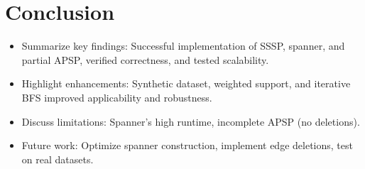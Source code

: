 \documentclass[11pt]{article}
\begin{document}
\section{Conclusion}
\begin{itemize}
    \item Summarize key findings: Successful implementation of SSSP, spanner, and partial APSP, verified correctness, and tested scalability.
    \item Highlight enhancements: Synthetic dataset, weighted support, and iterative BFS improved applicability and robustness.
    \item Discuss limitations: Spanner’s high runtime, incomplete APSP (no deletions).
    \item Future work: Optimize spanner construction, implement edge deletions, test on real datasets.
\end{itemize}



\end{document}
